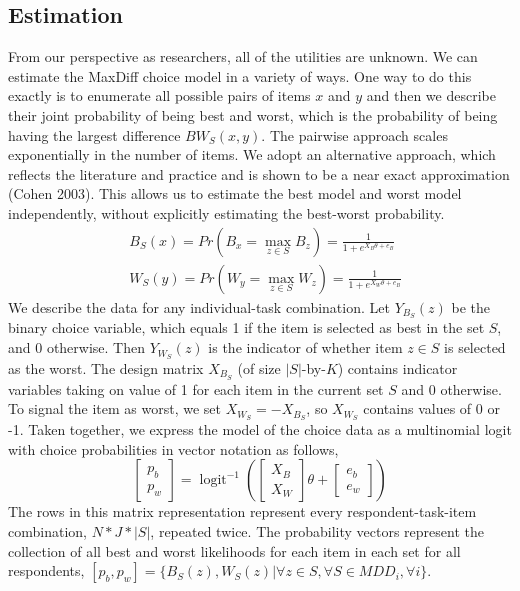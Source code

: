 \documentclass[mksc,blindrev]{informs3} %
\DeclareMathOperator{\logit}{logit}
\begin{document}
\subsection{Estimation}
From our perspective as researchers, all of the utilities are unknown. We can estimate the MaxDiff choice model in a variety of ways. One way to do this exactly is to enumerate all possible pairs of items $x$ and $y$ and then we describe their joint probability of being best and worst, which is the probability of being having the largest difference $BW_S(x,y)$. The pairwise approach scales exponentially in the number of items. We adopt an alternative approach, which reflects the literature and practice and is shown to be a near exact approximation (Cohen 2003). This allows us to estimate the best model and worst model independently, without explicitly estimating the best-worst probability. 
\begin{align*}
&B_S(x)=Pr(B_x=\max_{z \in S}B_z)=\frac{1}{1+e^{X_B \theta+ e_B}}\\
&W_S(y)=Pr(W_y=\max_{z \in S}W_z)=\frac{1}{1+e^{X_W \theta+ e_B}}
\end{align*}
We describe the data for any individual-task combination. Let $Y_{B_S}(z)$ be the binary choice variable, which equals 1 if the item is selected as best in the set $S$, and 0 otherwise. Then $Y_{W_S}(z)$ is the indicator of whether item $z \in S$ is selected as the worst. The design matrix $X_{B_S}$ (of size $|S|$-by-$K$) contains indicator variables taking on value of 1 for each item in the current set $S$ and 0 otherwise. To signal the item as worst, we set $X_{W_S}=-X_{B_S}$, so $X_{W_S}$ contains values of 0 or -1. Taken together, we express the model of the choice data as a multinomial logit with choice probabilities in vector notation as follows,
\[
\begin{bmatrix}
p_b\\
p_w
\end{bmatrix}
=\logit^{-1}(\begin{bmatrix}X_B\\X_W\end{bmatrix}\theta+\begin{bmatrix}e_b\\e_w \end{bmatrix})
\]
The rows in this matrix representation represent every respondent-task-item combination, $N*J*|S|$, repeated twice.  The probability vectors represent the collection of all best and worst likelihoods for each item in each set for all respondents, $[p_b,p_w]=\{B_S(z),W_S(z)|\forall z \in S, \forall S \in MDD_i, \forall i\}$.
\end{document}
